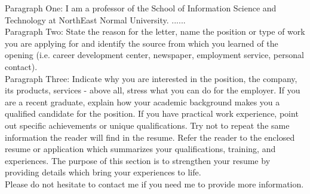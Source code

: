 Paragraph One: I am a professor of the School of Information Science and Technology at NorthEast Normal University.  ......\\

Paragraph Two: State the reason for the letter, name the position or type of work you are applying for and identify 
the source from which you learned of the opening (i.e. career development center, newspaper, employment service, personal contact).\\

Paragraph Three: Indicate why you are interested in the position, the company, its products, services - above all, stress what you can 
do for the employer. If you are a recent graduate, explain how your academic background makes you a qualified candidate for the position. 
If you have practical work experience, point out specific achievements or unique qualifications. Try not to repeat the same information 
the reader will find in the resume. Refer the reader to the enclosed resume or application which summarizes your qualifications, training, 
and experiences. The purpose of this section is to strengthen your resume by providing details which bring your experiences to life.\\

Please do not hesitate to contact me if you need me to provide more information.